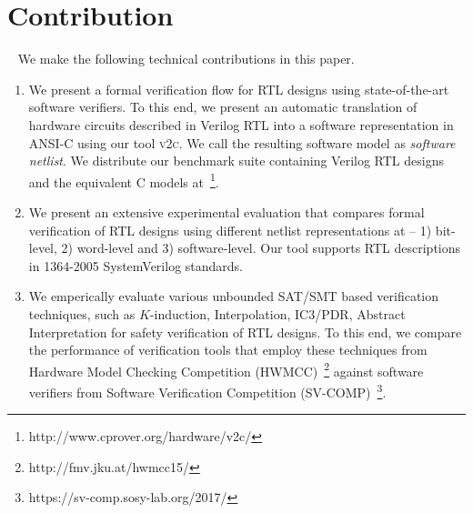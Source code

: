 \section{Contribution}~\label{contribution}
We make the following technical contributions in this paper.
%
\begin{enumerate}
\item We present a formal verification flow for RTL designs using state-of-the-art 
software verifiers.  To this end, we present an automatic translation of 
hardware circuits described in Verilog RTL into a software representation 
in ANSI-C using our tool \textsc{v2c}.  We call the resulting software model 
as {\em software netlist}.  We distribute our benchmark suite containing Verilog 
RTL designs and the equivalent C models at~\footnote{http://www.cprover.org/hardware/v2c/}. 

\item We present an extensive experimental evaluation that compares formal 
verification of RTL designs using different netlist representations at 
-- 1) bit-level, 2) word-level and 3) software-level.  Our tool supports 
RTL descriptions in 1364-2005 SystemVerilog standards. 

\item We emperically evaluate various unbounded SAT/SMT based verification techniques, 
such as $K$-induction, Interpolation, IC3/PDR, Abstract Interpretation for safety 
verification of RTL designs.  To this end, we compare the performance of verification 
tools that employ these techniques from Hardware Model Checking Competition 
(HWMCC)~\footnote{http://fmv.jku.at/hwmcc15/} against software verifiers from Software 
Verification Competition (SV-COMP)~\footnote{https://sv-comp.sosy-lab.org/2017/}.


\end{enumerate}
